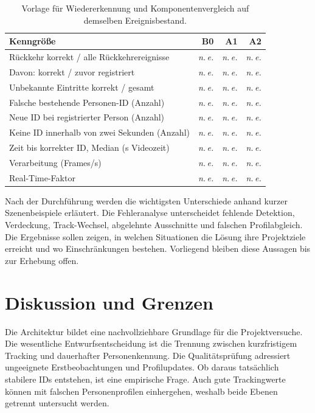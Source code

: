 \documentclass[runningheads]{llncs}
\newcommand{\evalpending}{\textit{n.\,e.}}
\begin{document}
\begin{table}[tbp]
\caption{Vorlage für Wiedererkennung und Komponentenvergleich auf demselben Ereignisbestand.}
\label{tab:results-reid}
\centering
\small
\begin{tabularx}{\linewidth}{@{}Xrrr@{}}
\toprule
Kenngrö{\ss}e & B0 & A1 & A2 \\
\midrule
Rückkehr korrekt / alle Rückkehrereignisse & \evalpending & \evalpending & \evalpending \\
Davon: korrekt / zuvor registriert & \evalpending & \evalpending & \evalpending \\
Unbekannte Eintritte korrekt / gesamt & \evalpending & \evalpending & \evalpending \\
Falsche bestehende Personen-ID (Anzahl) & \evalpending & \evalpending & \evalpending \\
Neue ID bei registrierter Person (Anzahl) & \evalpending & \evalpending & \evalpending \\
Keine ID innerhalb von zwei Sekunden (Anzahl) & \evalpending & \evalpending & \evalpending \\
Zeit bis korrekter ID, Median (s Videozeit) & \evalpending & \evalpending & \evalpending \\
Verarbeitung (Frames/s) & \evalpending & \evalpending & \evalpending \\
Real-Time-Faktor & \evalpending & \evalpending & \evalpending \\
\bottomrule
\end{tabularx}
\end{table}

Nach der Durchführung werden die wichtigsten Unterschiede anhand kurzer Szenenbeispiele erläutert. Die Fehleranalyse unterscheidet fehlende Detektion, Verdeckung, Track-Wechsel, abgelehnte Ausschnitte und falschen Profilabgleich. Die Ergebnisse sollen zeigen, in welchen Situationen die Lösung ihre Projektziele erreicht und wo Einschränkungen bestehen. Vorliegend bleiben diese Aussagen bis zur Erhebung offen.

\section{Diskussion und Grenzen}
\label{sec:discussion}

Die Architektur bildet eine nachvollziehbare Grundlage für die Projektversuche. Die wesentliche Entwurfsentscheidung ist die Trennung zwischen kurzfristigem Tracking und dauerhafter Personenkennung. Die Qualitätsprüfung adressiert ungeeignete Erstbeobachtungen und Profilupdates. Ob daraus tatsächlich stabilere IDs entstehen, ist eine empirische Frage. Auch gute Trackingwerte können mit falschen Personenprofilen einhergehen, weshalb beide Ebenen getrennt untersucht werden.
\end{document}
